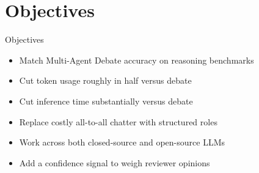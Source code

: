 \documentclass[10pt]{beamer}
\begin{document}
\section{Objectives}
\begin{frame}{Objectives}
\begin{itemize}
  \item Match Multi-Agent Debate accuracy on reasoning benchmarks
  \item Cut token usage roughly in half versus debate
  \item Cut inference time substantially versus debate
  \item Replace costly all-to-all chatter with structured roles
  \item Work across both closed-source and open-source LLMs
  \item Add a confidence signal to weigh reviewer opinions
\end{itemize}
\end{frame}
\end{document}
